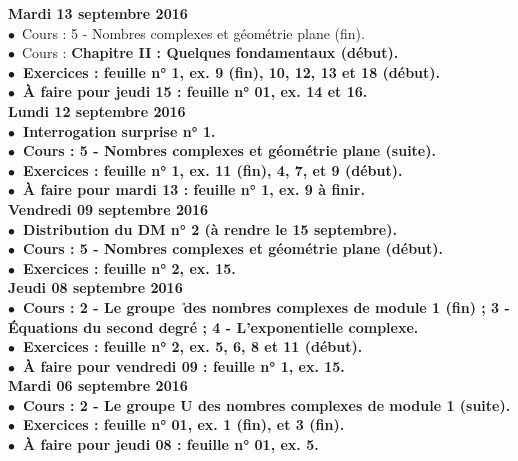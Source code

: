 \documentclass[12pt,a4paper]{article}
\begin{document}
\noindent\textbf{\bf Mardi 13 septembre 2016 }\\
$\bullet$\ Cours : 5 - Nombres complexes et géométrie plane (fin).\\
$\bullet$\ Cours : \bf Chapitre II \rm : Quelques fondamentaux (début).\\
$\bullet$\ Exercices : feuille n° 1, ex. 9 (fin), 10, 12, 13 et 18 (début).\\
$\bullet$\ À faire pour jeudi 15 : feuille n° 01, ex. 14 et 16.\vspace{.4cm}\\

\noindent\textbf{\bf Lundi 12 septembre 2016 }\\
$\bullet$\ Interrogation surprise n° 1.\\
$\bullet$\ Cours : 5 - Nombres complexes et géométrie plane (suite).\\
$\bullet$\ Exercices : feuille n° 1, ex. 11 (fin), 4, 7, et 9 (début).\\
$\bullet$\ À faire pour mardi 13 : feuille n° 1, ex. 9 à finir.\vspace{.4cm}\\
 
\noindent\textbf{Vendredi 09 septembre 2016 }\\
$\bullet$\ Distribution du DM n° 2 (à rendre le 15 septembre).\\
$\bullet$\ Cours : 5 - Nombres complexes et géométrie plane (début).\\
$\bullet$\ Exercices : feuille n° 2, ex. 15.\vspace{.4cm}\\

\noindent\textbf{\bf Jeudi 08 septembre 2016 }\\
$\bullet$\ Cours : 2 - Le groupe \U\ des nombres complexes de 
module 1 (fin) ; 3 - Équations du second degré ; 4 - L'exponentielle complexe.\\
$\bullet$\ Exercices : feuille n° 2, ex. 5, 6, 8 et 11 (début).\\
$\bullet$\ À faire pour vendredi 09 : feuille n° 1, ex. 15.\vspace{.4cm}\\
  
\noindent\textbf{\bf Mardi 06 septembre 2016 }\\
$\bullet$\ Cours : 2 - Le groupe \textbf{U} des nombres complexes de 
module 1 (suite).\\
$\bullet$\ Exercices : feuille n° 01, ex. 1 (fin), et 3 (fin).\\
$\bullet$\ À faire pour jeudi 08 : feuille n° 01, ex. 5.\vspace{.4cm}\\
\end{document}
